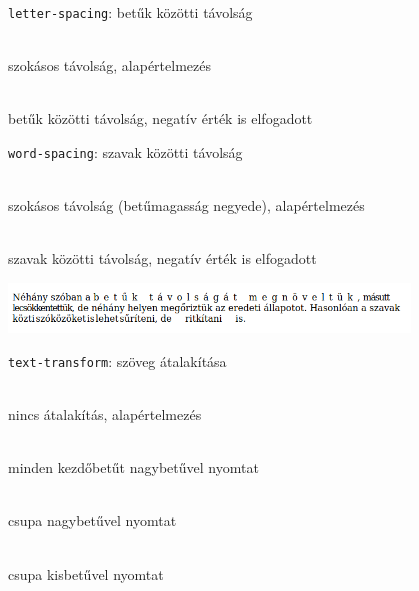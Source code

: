 \begin{frame}
  \texttt{letter-spacing}: betűk közötti távolság
  \begin{description}[m]
    \item[\texttt{normal}] \hfill \\ szokásos távolság, alapértelmezés
    \item[\emph{távolság}] \hfill \\ betűk közötti távolság, negatív érték is elfogadott
  \end{description}
  \vfill
  \texttt{word-spacing}: szavak közötti távolság
  \begin{description}[m]
    \item[\texttt{normal}] \hfill \\ szokásos távolság (betűmagasság negyede), alapértelmezés
    \item[\emph{távolság}] \hfill \\ szavak közötti távolság, negatív érték is elfogadott
  \end{description}
\end{frame}

\begin{frame}
  \begin{exampleblock}{}
    \footnotesize
    
    
  \end{exampleblock}
  \begin{center}
    \includegraphics[width=0.8\textwidth]{tavolsag.png}
  \end{center}
\end{frame}

\begin{frame}
  \texttt{text-transform}: szöveg átalakítása
  \begin{description}[m]
    \item[\texttt{normal}] \hfill \\ nincs átalakítás, alapértelmezés
    \item[\texttt{capitalize}] \hfill \\ minden kezdőbetűt nagybetűvel nyomtat
    \item[\texttt{uppercase}] \hfill \\ csupa nagybetűvel nyomtat
    \item[\texttt{lowercase}] \hfill \\ csupa kisbetűvel nyomtat
  \end{description}
\end{frame}

